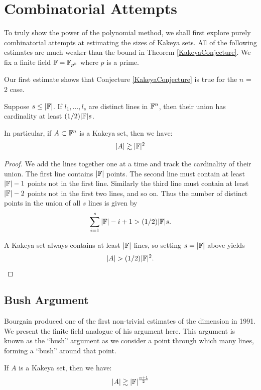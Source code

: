 \section{Combinatorial Attempts}
To truly show the power of the polynomial method, we shall first explore purely combinatorial attempts 
at estimating the sizes of Kakeya sets. All of the following estimates are much weaker than the bound in Theorem \ref{KakeyaConjecture}.
We fix a finite field $\mathbb F = \mathbb F_{p^k}$ where $p$ is a prime. 

Our first estimate shows that Conjecture \ref{KakeyaConjecture} is true for the $n$ = 2 case.

\begin{lemma}
    Suppose $s \leq |\mathbb F|$. If $l_1, \dots, l_s$ are distinct lines in $\mathbb F^n$, then their union has cardinality at least $(1/2)|\mathbb F|s$. 

    In particular, if $A \subset \mathbb F^n$ is a Kakeya set, then we have:
    \[
      |A| \gtrsim |\mathbb F|^2  
    \] \label{lem:kak-first-estimate}
\end{lemma} 
\begin{proof}
    We add the lines together one at a time and track the cardinality of their union. The first line contains $|\mathbb F|$ points. The second line must contain at least $|\mathbb F| -1$ points not in the first line. Similarly the third line must contain at least $|\mathbb F| -2$ points not in the first two lines, and so on. Thus the number of distinct points in the union of all $s$ lines is given by
    \[
      \sum_{i=1}^{s} |\mathbb F| - i + 1  > (1/2) |\mathbb F| s.
    \]

    A Kakeya set always contains at least $|\mathbb F|$ lines, so setting $s=|\mathbb F|$ above yields
    \[
        |A| > (1/2) |\mathbb F|^2 .
    \]

\end{proof}

\subsection{Bush Argument} 
Bourgain produced one of the first non-trivial estimates of the dimension in 1991.\cite{BUSH1991} We present the finite field analogue of his argument here.\cite{GUTH2016} This argument is known as the ``bush'' argument as we consider a point through which many lines, forming a ``bush'' around that point. 


\begin{theorem}

If $A$ is a Kakeya set, then we have:
$$|A| \gtrsim |\mathbb F|^{\frac{n+1}{2}}$$
\end{theorem}

